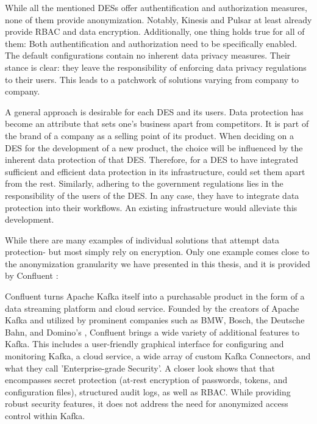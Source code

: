 While all the mentioned \acp{DES} offer authentification and authorization measures, none of them provide anonymization. Notably, Kinesis and Pulsar at least already provide \ac{RBAC} and data encryption. Additionally, one thing holds true for all of them: Both authentification and authorization need to be specifically enabled. The default configurations contain no inherent data privacy measures. Their stance is clear: they leave the responsibility of enforcing data privacy regulations to their users. This leads to a patchwork of solutions varying from company to company. \par
A general approach is desirable for each \ac{DES} and its users. Data protection has become an attribute that sets one's business apart from competitors. It is part of the brand of a company as a selling point of its product. When deciding on a \ac{DES} for the development of a new product, the choice will be influenced by the inherent data protection of that \ac{DES}. Therefore, for a \ac{DES} to have integrated sufficient and efficient data protection in its infrastructure, could set them apart from the rest. Similarly, adhering to the government regulations lies in the responsibility of the users of the \ac{DES}. In any case, they have to integrate data protection into their workflows. An existing infrastructure would alleviate this development.\par
While there are many examples of individual solutions that attempt data protection- but most simply rely on encryption. Only one example comes close to the anonymization granularity we have presented in this thesis, and it is provided by Confluent \cite{confluent}: \par
Confluent turns Apache Kafka itself into a purchasable product in the form of a data streaming platform and cloud service. Founded by the creators of Apache Kafka and utilized by prominent companies such as BMW, Bosch, the Deutsche Bahn, and Domino's \cite{confluent_customers}, Confluent brings a wide variety of additional features to Kafka. This includes a user-friendly graphical interface for configuring and monitoring Kafka, a cloud service, a wide array of custom Kafka Connectors, and what they call 'Enterprise-grade Security'. A closer look shows that that encompasses secret protection (at-rest encryption of passwords, tokens, and configuration files), structured audit logs, as well as \ac{RBAC}. While providing robust security features, it does not address the need for anonymized access control within Kafka. \par
